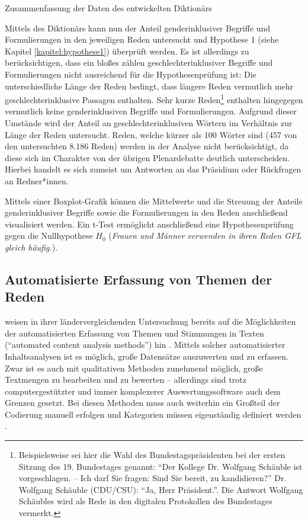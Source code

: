 \documentclass[12pt, 
    twoside=false, 
    bibliography=totoc, 
    numbers=endperiod, 
    headings=normal, 
    toc=chapterentrydotfill
    ]{scrbook}
\begin{document}
\begin{table}[htb]
    \centering
    \caption[Zusammenfassung der Daten des entwickelten Diktionärs]{Zusammenfassung der Daten des entwickelten Diktionärs}
    
    \label{table:zusammenfassung_dict}
\end{table}

Mittels des Diktionärs kann nun der Anteil genderinklusiver Begriffe und Formulierungen in den jeweiligen Reden untersucht und Hypothese 1 (siehe Kapitel \ref{kapitel:hypothese1}) überprüft werden. Es ist allerdings zu berücksichtigen, dass ein bloßes zählen geschlechterinklusiver Begriffe und Formulierungen nicht ausreichend für die Hypothesenprüfung ist:
Die unterschiedliche Länge der Reden bedingt, dass längere Reden vermutlich mehr geschlechterinklusive Passagen enthalten. Sehr kurze Reden\footnote{Beispielsweise sei hier die Wahl des Bundestagspräsidenten bei der ersten Sitzung des 19. Bundestages genannt: \enquote{Der Kollege Dr. Wolfgang Schäuble ist vorgeschlagen. -- Ich darf Sie fragen: Sind Sie bereit, zu kandidieren?} Dr. Wolfgang Schäuble (CDU/CSU): \enquote{Ja, Herr Präsident.}. Die Antwort Wolfgang Schäubles wird als Rede in den digitalen Protokollen des Bundestages vermerkt.} enthalten hingegegen vermutlich keine genderinklusiven Begriffe und Formulierungen. Aufgrund dieser Umstände wird der Anteil an geschlechterinklusiven Wörtern im Verhältnis zur Länge der Reden untersucht. 
Reden, welche kürzer als 100 Wörter sind (457 von den untersuchten 8.186 Reden) werden in der Analyse nicht berücksichtigt, da diese sich im Charakter von der übrigen Plenardebatte deutlich unterscheiden. Hierbei handelt es sich zumeist um Antworten an das Präsidium oder Rückfragen an Redner*innen.

Mittels einer Boxplot-Grafik können die Mittelwerte und die Streuung der Anteile genderinklusiver Begriffe sowie die Formulierungen in den Reden anschließend visualisiert werden. Ein t-Test \parencite[vgl.][164ff.]{diaz-bone_2018} ermöglicht anschließend eine Hypothesenprüfung gegen die Nullhypothese $H_0$ (\emph{Frauen und Männer verwenden in ihren Reden GFL gleich häufig.}).

\subsection{Automatisierte Erfassung von Themen der Reden} \label{kapitel:methode_inhalte}

\citeauthor{back_2018} weisen in ihrer ländervergleichenden Untersuchung bereits auf die Möglichkeiten der automatisierten Erfassung von Themen und Stimmungen in Texten (\enquote{automated
content analysis methods}) hin \parencite*[18]{back_2018}. Mittels solcher automatisierter Inhaltsanalysen ist es möglich, große Datensätze auszuwerten und zu erfassen. Zwar ist es auch mit qualitativen Methoden zunehmend möglich, große Textmengen zu bearbeiten und zu bewerten \parencite[vgl.][]{raediker_2019} -- allerdings sind trotz computergestützter und immer komplexerer Auswertungssoftware auch dem Grenzen gesetzt. Bei diesen Methoden muss auch weiterhin ein Großteil der Codierung manuell erfolgen und Kategorien müssen eigenständig definiert werden \parencite[52f.]{raediker_2019}. 
\end{document}
